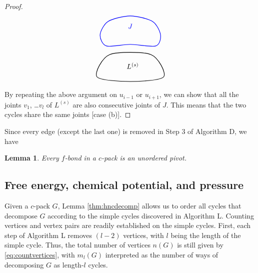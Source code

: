 \documentclass[preprint]{revtex4-1}
\newtheorem{lemm}[thrm]{Lemma}
\begin{document}
\begin{proof}
\[\begin{tikzpicture}
    \draw[draw=black, thick]
      plot [smooth cycle]
      coordinates{ ( 0.8*\sz, 0.6*\sz)
                   ( 2.4*\sz, 3.4*\sz)
                   ( 7.6*\sz, 3.4*\sz)
                   ( 9.2*\sz, 0.6*\sz)
                   ( 5.0*\sz, 0.0*\sz) };

    \node (L) at (5.3*\sz, 2.0*\sz) {$L^{(s)}$};

    \draw[thick, draw=blue]
      plot [smooth cycle]
      coordinates{
                   ( 2.0*\sz, 4.5*\sz)
                   ( 1.2*\sz, 5.9*\sz)
                   ( 2.2*\sz, 7.6*\sz)
                   ( 5.0*\sz, 8.3*\sz)
                   ( 7.8*\sz, 7.6*\sz)
                   ( 8.8*\sz, 5.9*\sz)
                   ( 8.2*\sz, 4.5*\sz)
                   ( 5.0*\sz, 4.7*\sz) };

    \node (J) at (5.0*\sz, 7.0*\sz) [blue] {$J$};
  \end{tikzpicture}
\]

By repeating the above argument on $u_{i-1}$ or $u_{i+1}$,
we can show that
  all the joints $v_1$, \dots $v_l$ of $L^{(s)}$
  are also consecutive joints of $J$.
%
This means that the two cycles share the same joints
  [case (b)].
\end{proof}



Since every edge (except the last one) is removed in Step 3 of Algorithm D,
we have
\begin{lemm}
  Every $f$-bond in a $c$-pack is an unordered pivot.
\label{thm:hncfpivot}
\end{lemm}




\subsection{\label{sec:hncFexmuex}Free energy, chemical potential, and pressure}


Given a $c$-pack $G$,
  Lemma \ref{thm:hncdecomp} allows us
  to order all cycles that decompose $G$
  according to the simple cycles
  discovered in Algorithm L.
%
Counting vertices and vertex pairs
  are readily established on the simple cycles.
%
First, each step of Algorithm L removes $(l - 2)$ vertices,
  with $l$ being the length of the simple cycle.
%
Thus, the total number of vertices $n(G)$
  is still given by \eqref{eq:countvertices},
  with $m_l(G)$ interpreted as
  the number of ways
  of decomposing $G$ as length-$l$ cycles.
\end{document}
